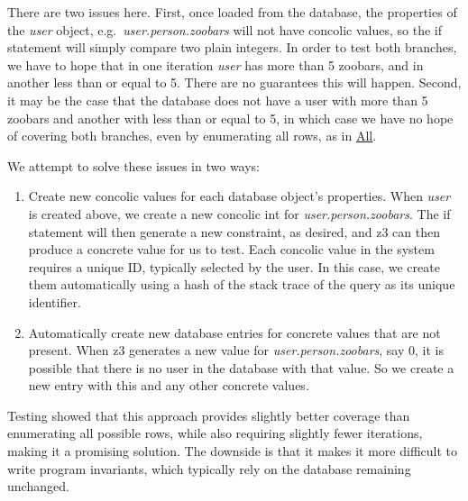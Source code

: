 \documentclass{scrartcl}
\begin{document}
\begin{enumerate}
  There are two issues here. First, once loaded from the database, the
  properties of the \textit{user} object, e.g.\ \textit{user.person.zoobars}
  will not have concolic values, so the if statement will simply compare
  two plain integers. In order to test both branches, we have to hope that
  in one iteration \textit{user} has more than 5 zoobars, and in another
  less than or equal to 5. There are no guarantees this will happen.
  Second, it may be the case that the database does not have a user
  with more than 5 zoobars and another with less than or equal to 5,
  in which case we have no hope of covering both branches, even by
  enumerating all rows, as in \underline{All}.

  We attempt to solve these issues in two ways:
  \begin{enumerate}
  \item Create new concolic values for each database object's properties. When
    \textit{user} is created above, we create a new concolic int for
    \textit{user.person.zoobars}. The if statement will then generate a
    new constraint, as desired, and z3 can then produce a concrete value for us
    to test. Each concolic value in the system requires a unique ID, typically
    selected by the user. In this case, we create them automatically using a
    hash of the stack trace of the query as its unique identifier.

  \item Automatically create new database entries for concrete values that are
    not present. When z3 generates a new value for \textit{user.person.zoobars},
    say 0, it is possible that there is no user in the database with that value.
    So we create a new entry with this and any other concrete values.
  \end{enumerate}

  Testing showed that this approach provides slightly better coverage
  than enumerating all possible rows, while also requiring slightly
  fewer iterations, making it a promising solution. The downside is
  that it makes it more difficult to write program invariants, which
  typically rely on the database remaining unchanged.
\end{enumerate}
\end{document}
